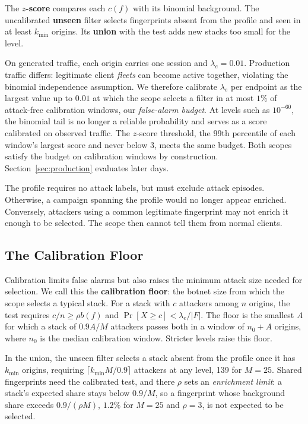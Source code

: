 \documentclass[conference,letterpaper,10pt]{IEEEtran}
\newcommand\1{\textit{(i)}}
\newcommand\2{\textit{(ii)}}
\newcommand\3{\textit{(iii)}}
\newcommand\4{\textit{(iv)}}
\newcommand\5{\textit{(v)}}
\newcommand\6{\textit{(vi)}}
\newcommand\7{\textit{(vii)}}
\newcommand\8{\textit{(viii)}}
\newcommand\9{\textit{(ix)}}
\begin{document}
The \textbf{$z$-score} compares each $c(f)$ with its
binomial background. The uncalibrated \textbf{unseen} filter
selects fingerprints absent from the profile and seen in at
least $k_{\min}$ origins. Its \textbf{union} with the test
adds new stacks too small for the level.

On generated traffic, each origin carries one session
and $\lambda_e=0.01$. Production traffic differs:
legitimate client \textit{fleets} can become active
together, violating the binomial independence assumption.
We therefore calibrate $\lambda_e$ per endpoint as the
largest value up to $0.01$ at which the scope selects a
filter in at most $1\%$ of attack-free
calibration windows, our \textit{false-alarm budget}.
At levels such as $10^{-60}$, the binomial tail is no longer
a reliable probability and serves as a score calibrated on
observed traffic.
The $z$-score threshold, the 99th percentile of each
window's largest score and never below 3, meets the same
budget. Both scopes satisfy
the budget on calibration windows by construction.
Section~\ref{sec:production} evaluates later days.

The profile requires no attack labels, but must exclude
attack episodes. Otherwise, a campaign spanning the
profile would no longer appear enriched. Conversely,
attackers using a common legitimate fingerprint may
not enrich it enough to be selected. The scope then cannot
tell them from normal clients.

\subsection{The Calibration Floor}
\label{sec:floor}

Calibration limits false alarms but also raises the minimum
attack size needed for selection. We call this the
\textbf{calibration floor}: the botnet size from which the
scope selects a typical stack.
For a stack with $c$ attackers among $n$ origins, the test
requires $c/n\geq\rho b(f)$ and
$\Pr[X\geq c]<\lambda_e/|F|$.
The floor is the smallest $A$ for which a stack of $0.9A/M$
attackers passes both in a window of $n_0+A$ origins, where
$n_0$ is the
median calibration window. Stricter levels raise
this floor.

In the union, the unseen filter selects a stack absent from the
profile once it has $k_{\min}$ origins, requiring $\lceil
k_{\min}M/0.9\rceil$ attackers at any level, 139 for $M=25$.
Shared fingerprints need the calibrated test, and there
$\rho$ sets an \textit{enrichment limit}: a stack's expected
share stays below $0.9/M$, so a fingerprint whose background
share exceeds $0.9/(\rho M)$, $1.2\%$ for $M=25$ and
$\rho=3$, is not expected to be selected.
\end{document}
